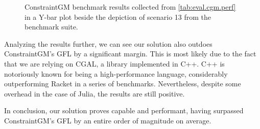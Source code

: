 \begin{figure}[htb]
  \begin{subfigure}[t]{.75\linewidth}
    \centering
    \label{fig:eval.cgm.perf.plot}
  \end{subfigure}
  \hfill
  \begin{subfigure}[t]{.22\linewidth}
    \centering
    \label{fig:eval.cgm.perf.13}
  \end{subfigure}
  \caption[ConstraintGM benchmarks and Scenario 13]{\label{fig:eval.cgm.perf}%
    ConstraintGM benchmark results collected from \cref{tab:eval.cgm.perf} in a
    Y-bar plot  beside the depiction of scenario
    13  from the benchmark suite.}
\end{figure}

Analyzing the results further, we can see our solution also outdoes
ConstraintGM's \ac{GFL} by a significant margin.  This is most likely due to the
fact that we are relying on \ac{CGAL}, a library implemented in C++.  C++ is
notoriously known for being a high-performance language, considerably
outperforming Racket in a series of benchmarks.  Nevertheless, despite some
overhead in the case of Julia, the results are still positive.

In conclusion, our solution proves capable and performant, having surpassed
ConstraintGM's \ac{GFL} by an entire order of magnitude on average.
